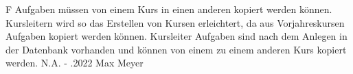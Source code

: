 \begin{myreq}
    \threeinline
    {\reqno }
    {\reqtype F}
    {}
    \reqdesc Aufgaben müssen von einem Kurs in einen anderen kopiert werden können.
    \reqrat Kursleitern wird so das Erstellen von Kursen erleichtert, da aus Vorjahreskursen Aufgaben kopiert werden können.
    \reqorig Kursleiter
    \reqfit Aufgaben sind nach dem Anlegen in der Datenbank vorhanden und können von einem zu einem anderen Kurs kopiert werden.
    \twoinline
    {}
    {}
    \twoinline
    {}
    {\reqconf N.A.}
    \reqmater -
    .2022 Max Meyer
\end{myreq}